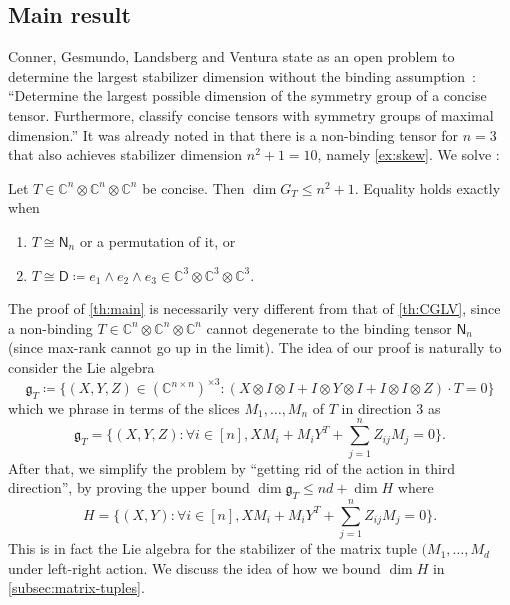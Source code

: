\documentclass[11pt,a4paper]{article}
\numberwithin{equation}{section}
\newcommand{\CC}{\mathbb{C}}
\begin{document}
\subsection{Main result}

Conner, Gesmundo, Landsberg and Ventura state as an open problem to determine the largest stabilizer dimension without the binding assumption~\cite[Problem~3.5]{conner2021tensorsmaximalsymmetries}: ``Determine the largest possible dimension of the symmetry group of a concise
tensor. Furthermore, classify concise tensors with symmetry groups of maximal dimension.'' It was already noted in \cite[Remark~3.4]{conner2021tensorsmaximalsymmetries} that there is a non-binding tensor for $n=3$ that also achieves stabilizer dimension $n^2+1 = 10$, namely \cref{ex:skew}.
We solve \cite[Problem~3.5]{conner2021tensorsmaximalsymmetries}:


\begin{theorem}\label{th:main}
Let $T \in \CC^n \otimes \CC^n \otimes \CC^n$ be concise. Then $\dim G_T \leq n^2 + 1$. Equality holds exactly when
\begin{enumerate}[\upshape (1)]
\item $T \cong \mathsf{N}_n$ or a permutation of it, or
\item $T \cong \mathsf{D} \coloneqq e_1 \wedge e_2 \wedge e_3 \in \CC^3 \otimes \CC^3 \otimes \CC^3$.
\end{enumerate}
\end{theorem}
The proof of \cref{th:main} is necessarily very different from that of \cref{th:CGLV}, since a non-binding $T \in \CC^n \otimes \CC^n \otimes \CC^n$ cannot degenerate to the binding tensor $\mathsf{N}_n$ (since max-rank cannot go up in the limit). The idea of our proof is naturally to consider the Lie algebra 
\[
\mathfrak{g}_T \coloneqq \{ (X,Y,Z) \in (\CC^{n \times n})^{\times 3} : (X \otimes I \otimes I + I \otimes Y \otimes I + I \otimes I \otimes Z)\cdot T = 0 \}
\]
which we phrase in terms of the slices $M_1, \ldots, M_n$ of $T$ in direction 3 as
\[
\mathfrak{g}_T = \{(X,Y,Z) : \forall i \in [n], X M_i + M_i Y^T + \sum_{j=1}^n Z_{ij}M_j = 0\}.
\]
After that, we simplify the problem by ``getting rid of the action in third direction'', by proving the upper bound $\dim \mathfrak{g}_T \leq nd + \dim H$ where 
\[
H = \{(X,Y) : \forall i \in [n], X M_i + M_i Y^T + \sum_{j=1}^n Z_{ij}M_j = 0\}.
\]
This is in fact the Lie algebra for the stabilizer of the matrix tuple $(M_1, \ldots, M_d$ under left-right action.
We discuss the idea of how we bound $\dim H$ in \cref{subsec:matrix-tuples}.
\end{document}
